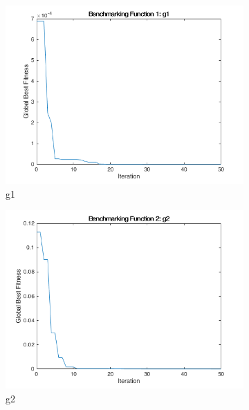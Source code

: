 \begin{figure}
  \centering
  \begin{subfigure}[b]{0.4\textwidth}
    \includegraphics[width=\textwidth]{img/summary/g1}
    \caption{g1}
  \end{subfigure}
  \begin{subfigure}[b]{0.4\textwidth}
    \includegraphics[width=\textwidth]{img/summary/g2}
    \caption{g2}
  \end{subfigure}
  \begin{subfigure}[b]{0.4\textwidth}

\end{subfigure}
\end{figure}
